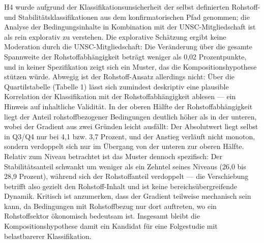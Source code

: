 H4 wurde aufgrund der Klassifikationsunsicherheit der selbst definierten Rohstoff- und Stabilitätsklassifikationen aus dem konfirmatorischen Pfad genommen; die Analyse der Bedingungsinhalte in Kombination mit der UNSC-Mitgliedschaft ist als rein explorativ zu verstehen. Die explorative Schätzung ergibt keine Moderation durch die UNSC-Mitgliedschaft: Die Veränderung über die gesamte Spannweite der Rohstoffabhängigkeit beträgt weniger als 0{,}02 Prozentpunkte, und in keiner Spezifikation zeigt sich ein Muster, das die Kompositionshypothese stützen würde. Abwegig ist der Rohstoff-Ansatz allerdings nicht: Über die Quartilstabelle (Tabelle 1) lässt sich zumindest deskriptiv eine plausible Korrelation der Klassifikation mit der Rohstoffabhängigkeit ablesen — ein Hinweis auf inhaltliche Validität. In der oberen Hälfte der Rohstoffabhängigkeit liegt der Anteil rohstoffbezogener Bedingungen deutlich höher als in der unteren, wobei der Gradient aus zwei Gründen leicht ausfällt: Der Absolutwert liegt selbst in Q3/Q4 nur bei 4{,}1 bzw. 3{,}7 Prozent, und der Anstieg verläuft nicht monoton, sondern verdoppelt sich nur im Übergang von der unteren zur oberen Hälfte. Relativ zum Niveau betrachtet ist das Muster dennoch spezifisch: Der Stabilitätsanteil schwankt um weniger als ein Zehntel seines Niveaus (26{,}0 bis 28{,}9 Prozent), während sich der Rohstoffanteil verdoppelt — die Verschiebung betrifft also gezielt den Rohstoff-Inhalt und ist keine bereichsübergreifende Dynamik. Kritisch ist anzumerken, dass der Gradient teilweise mechanisch sein kann, da Bedingungen mit Rohstoffbezug nur dort auftreten, wo ein Rohstoffsektor ökonomisch bedeutsam ist. Insgesamt bleibt die Kompositionshypothese damit ein Kandidat für eine Folgestudie mit belastbarerer Klassifikation.
